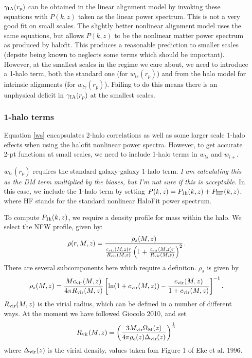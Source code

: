 \documentclass[onecolumn,amsmath,aps,fleqn, superscriptaddress]{revtex4}
\begin{document}
$\gamma_{\rm IA}(r_p)$ can be obtained in the linear alignment model by invoking these equations with $P(k,z)$ taken as the linear power spectrum. This is not a very good fit on small scales. The slightly better nonlinear alignment model uses the same equations, but allows $P(k,z)$ to be the nonlinear matter power spectrum as produced by halofit. This produces a reasonable prediction to smaller scales (depsite being known to neglects some terms which should be important). However, at the smallest scales in the regime we care about, we need to introduce a 1-halo term, both the standard one (for $w_{ls}(r_p)$) and from the halo model for intrinsic alignments (for $w_{l\gamma}(r_p)$). Failing to do this means there is an unphysical deficit in $\gamma_{\rm IA}(r_p)$ at the smallest scales.

\subsubsection*{1-halo terms}
Equation \ref{ws} encapsulates 2-halo correlations as well as some larger scale 1-halo effects when using the halofit nonlinear power spectra. However, to get accurate 2-pt functions at small scales, we need to include 1-halo terms in $w_{ls}$ and $w_{l+}$. 

$w_{ls}(r_p)$ requires the standard galaxy-galaxy 1-halo term. {\it I am calculating this as the DM term multiplied by the biases, but I'm not sure if this is acceptable}. In this case, we include the 1-halo term by setting $P(k,z) = P_{\rm 1h}(k,z) + P_{\rm HF}(k,z)$, where HF stands for the standard nonlinear HaloFit power spectrum. 

To compute $P_{\rm 1h}(k,z)$, we require a density profile for mass within the halo. We select the NFW profile, given by:
\begin{equation}
\rho(r, M, z) = \frac{\rho_s(M,z)}{\frac{c_{\rm vir}(M,z)r}{R_{\rm vir}(M,z)}\left(1+\frac{c_{\rm vir}(M,z)r}{R_{\rm vir}(M,z)}\right)^2}.
\label{nfw}
\end{equation}
There are several subcomponents here which require a definiton. $\rho_s$ is given by
\begin{equation}
\rho_s(M,z) = \frac{Mc_{\rm vir}(M,z)}{4 \pi R_{\rm vir}(M,z)}\left[{\rm ln} (1+ c_{\rm vir}(M,z)) - \frac{c_{\rm vir}(M,z)}{1+c_{\rm vir}(M,z)}\right]^{-1}.
\label{rhos}
\end{equation}
$R_{\rm vir}(M,z)$ is the virial radius, which can be defined in a number of different ways. At the moment we have followed Giocolo 2010, and set
\begin{equation}
R_{\rm vir}(M,z) = \left(\frac{3 M_{\rm vir}\Omega_{\rm M}(z)}{4 \pi \rho_c(z)\Delta_{\rm vir}(z)}\right)^{\frac{1}{3}}
\label{Rvir}
\end{equation}
where $\Delta_{\rm vir}(z)$ is the virial density, values taken fom Figure 1 of Eke et al. 1996.
\end{document}

